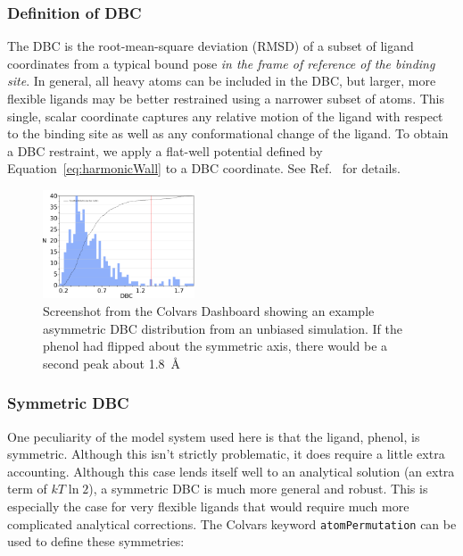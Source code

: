 \documentclass[9pt,tutorial]{Styling/livecoms}
\begin{document}
\subsubsection{Definition of DBC}
The DBC is the root-mean-square deviation (RMSD) of a subset of ligand coordinates from a typical bound pose \textit{in the frame of reference of the binding site}.
In general, all heavy atoms can be included in the DBC, but larger, more flexible ligands may be better restrained using a narrower subset of atoms. 
This single, scalar coordinate captures any relative motion of the ligand with respect to the binding site as well as any conformational change of the ligand. 
To obtain a DBC restraint, we apply a flat-well potential defined by Equation~\ref{eq:harmonicWall} to a DBC coordinate.
See Ref.~ for details.
\begin{figure}[!htb]
    \centering
\includegraphics[width=0.4\textwidth]{histogram.png} 
    \caption{Screenshot from the Colvars Dashboard showing an example asymmetric DBC distribution from an unbiased simulation. If the phenol had flipped about the symmetric axis, there would be a second peak about 1.8~\AA{}}
\label{step:DBCwidth}
\end{figure}

\subsubsection{Symmetric DBC}
\label{app:Symmetry}

One peculiarity of the model system used here is that the ligand, phenol, is symmetric. 
Although this isn't strictly problematic, it does require a little extra accounting. 
Although this case lends itself well to an analytical solution (an extra term of $kT\ln 2$), a symmetric DBC is much more general and robust\cite{Ebrahimi2022}.
This is especially the case for very flexible ligands that would require much more complicated analytical corrections. The Colvars keyword \texttt{atomPermutation} can be used to define these symmetries:
\end{document}

